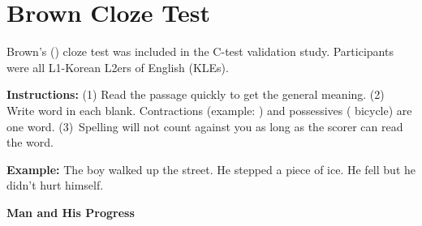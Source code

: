 
\chapter{Brown Cloze Test}\label{app-brown}

Brown's (\citeyear{brown1980}) cloze test was included in the C-test validation study. Participants were all L1-Korean L2ers of English (KLEs).

\vspace{0.5cm}

\textbf{Instructions:} (1) Read the passage quickly to get the general meaning. (2) Write  word in each blank. Contractions (example: ) and possessives ( bicycle) are one word. \mbox{(3) Spelling} will not count against you as long as the scorer can read the word.

\vspace{0.5 cm}

\textbf{Example:} The boy walked up the street. He stepped  a piece of ice. He fell  but he didn't hurt himself.

\vspace{0.5 cm}

\begin{center} \textbf{Man and His Progress} \end{center}

